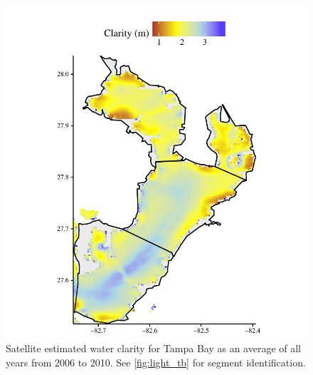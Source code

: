 \documentclass[letterpaper,12pt,oneside]{article}\usepackage[]{graphicx}\usepackage[]{color}
\begin{document}

\begin{figure}
\centering
\includegraphics[width = \textwidth]{figs/Fig6.pdf}
\caption{Satellite estimated water clarity for Tampa Bay as an average of all years from 2006 to 2010. See \cref{fig:light_tb} for segment identification.}
\label{fig:clarity_tb}
\end{figure}

\end{document}
